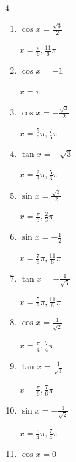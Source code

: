\begin{multicols}{4}
\begin{enumerate}
        $\displaystyle x = \frac{2}{3}\pi , \frac{4}{3}\pi$

  \item $\displaystyle \cos{x}  = \frac{\sqrt{3}}{2}$

        $\displaystyle x = \frac{\pi}{6} , \frac{11}{6}\pi$

  \item $\displaystyle \cos{x}  = -1$

        $\displaystyle x = \pi$

  \item $\displaystyle \cos{x}  = -\frac{\sqrt{3}}{2}$

        $\displaystyle x = \frac{5}{6}\pi , \frac{7}{6}\pi$

  \item $\displaystyle \tan{x}  = -\sqrt{3}$

        $\displaystyle x = \frac{2}{3}\pi , \frac{5}{3}\pi$

\columnbreak %

\resetques

  \item $\displaystyle \sin{x}  = \frac{\sqrt{3}}{2}$

        $\displaystyle x = \frac{\pi}{3} , \frac{2}{3}\pi$

  \item $\displaystyle \sin{x}  = -\frac{1}{2}$

        $\displaystyle x = \frac{7}{6}\pi , \frac{11}{6}\pi$

  \item $\displaystyle \tan{x}  = -\frac{1}{\sqrt{3}}$

        $\displaystyle x = \frac{5}{6}\pi , \frac{11}{6}\pi$

  \item $\displaystyle \cos{x}  = \frac{1}{\sqrt{2}}$

        $\displaystyle x = \frac{\pi}{4} , \frac{7}{4}\pi$

  \item $\displaystyle \tan{x}  = \frac{1}{\sqrt{3}}$

        $\displaystyle x = \frac{\pi}{6} , \frac{7}{6}\pi$

  \item $\displaystyle \sin{x}  = -\frac{1}{\sqrt{2}}$

        $\displaystyle x = \frac{5}{4}\pi , \frac{7}{4}\pi$

  \item $\displaystyle \cos{x}  = 0$


\end{enumerate}
\end{multicols}
